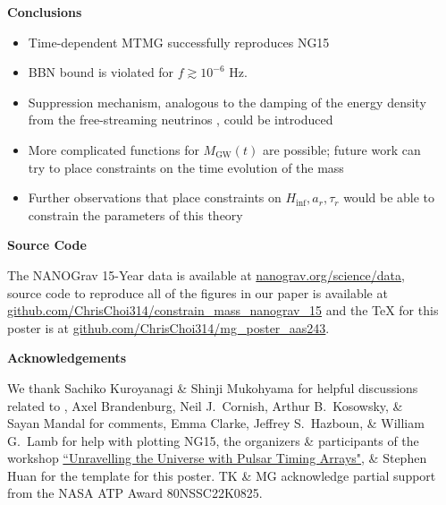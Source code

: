 \documentclass{beamer}                             %
\newcommand{\blocktitle}[1]{{\Large \textbf{#1}}}
\begin{document}
\begin{frame}[t]
\begin{columns}[T]
\begin{column}{0.01\textwidth}
  \begin{center}
    \textcolor{darksilver}{\rule[-1cm]{1mm}{0.8\textheight}}
  \end{center}
\end{column}


\begin{column}{0.30\textwidth}
\begin{tcolorbox}
\blocktitle{Conclusions}
    \begin{itemize}
        \item Time-dependent MTMG successfully reproduces NG15
        \item BBN bound is violated for $f \gtrsim 10^{-6}$ Hz.
        \item Suppression mechanism, analogous to the damping of the energy density from the free-streaming neutrinos \cite{Durrer:1997ta}, could be introduced
        \item More complicated functions for $M_{\text{GW}}(t)$ are possible; future work can try to place constraints on the time evolution of the mass
        \item Further observations that place constraints on $H_{\text{inf}}, a_r, \tau_r$ would be able to constrain the parameters of this theory
    \end{itemize}
  \end{tcolorbox}

\begin{tcolorbox}
    \blocktitle{Source Code} 
    
    The NANOGrav 15-Year data is available at \href{https://nanograv.org/science/data}{nanograv.org/science/data}, source code to reproduce all of the figures in our paper \cite{Choi:2023tun} is available at \href{https://github.com/ChrisChoi314/constrain_mass_nanograv_15}{github.com/ChrisChoi314/constrain\_mass\_nanograv\_15} and the TeX for this poster is at \href{https://github.com/ChrisChoi314/mg_poster_aas243}{github.com/ChrisChoi314/mg\_poster\_aas243}. 
    
  \end{tcolorbox}
  
  \begin{tcolorbox}
    \blocktitle{Acknowledgements}
    
    We thank Sachiko Kuroyanagi \& Shinji Mukohyama for helpful discussions related to \cite{Fujita:2018ehq}, Axel Brandenburg, Neil J.\ Cornish, Arthur B.\ Kosowsky, \& Sayan Mandal for comments, Emma Clarke, Jeffrey S.\ Hazboun, \& William G.\ Lamb for help with plotting NG15, the organizers \& participants of the workshop \href{https://indico.cern.ch/event/1314635/overview}{``Unravelling the Universe with Pulsar Timing Arrays"}, \& Stephen Huan for the template for this poster. TK \& MG acknowledge partial support from the NASA ATP Award 80NSSC22K0825.
  \end{tcolorbox}


\end{column}
\end{columns}
\end{frame}
\end{document}
